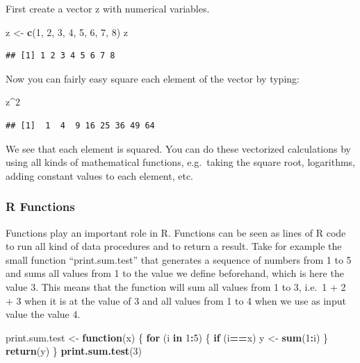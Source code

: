 \documentclass[]{book}
\newenvironment{Shaded}{\begin{snugshade}}{\end{snugshade}}
\newcommand{\KeywordTok}[1]{\textcolor[rgb]{0.13,0.29,0.53}{\textbf{#1}}}
\newcommand{\DecValTok}[1]{\textcolor[rgb]{0.00,0.00,0.81}{#1}}
\newcommand{\StringTok}[1]{\textcolor[rgb]{0.31,0.60,0.02}{#1}}
\newcommand{\ControlFlowTok}[1]{\textcolor[rgb]{0.13,0.29,0.53}{\textbf{#1}}}
\newcommand{\OperatorTok}[1]{\textcolor[rgb]{0.81,0.36,0.00}{\textbf{#1}}}
\newcommand{\NormalTok}[1]{#1}
\theoremstyle{definition}
\theoremstyle{definition}
\theoremstyle{definition}
\theoremstyle{remark}
\begin{document}
First create a vector z with numerical variables.

\begin{Shaded}
\begin{Highlighting}[]
\NormalTok{z <-}\StringTok{ }\KeywordTok{c}\NormalTok{(}\DecValTok{1}\NormalTok{, }\DecValTok{2}\NormalTok{, }\DecValTok{3}\NormalTok{, }\DecValTok{4}\NormalTok{, }\DecValTok{5}\NormalTok{, }\DecValTok{6}\NormalTok{, }\DecValTok{7}\NormalTok{, }\DecValTok{8}\NormalTok{)}
\NormalTok{z}
\end{Highlighting}
\end{Shaded}

\begin{verbatim}
## [1] 1 2 3 4 5 6 7 8
\end{verbatim}

Now you can fairly easy square each element of the vector by typing:

\begin{Shaded}
\begin{Highlighting}[]
\NormalTok{z}\OperatorTok{^}\DecValTok{2}
\end{Highlighting}
\end{Shaded}

\begin{verbatim}
## [1]  1  4  9 16 25 36 49 64
\end{verbatim}

We see that each element is squared. You can do these vectorized
calculations by using all kinds of mathematical functions, e.g.~taking
the square root, logarithms, adding constant values to each element,
etc.

\subsubsection{R Functions}\label{r-functions}

Functions play an important role in R. Functions can be seen as lines of
R code to run all kind of data procedures and to return a result. Take
for example the small function ``print.sum.test'' that generates a
sequence of numbers from 1 to 5 and sums all values from 1 to the value
we define beforehand, which is here the value 3. This means that the
function will sum all values from 1 to 3, i.e.~1 + 2 + 3 when it is at
the value of 3 and all values from 1 to 4 when we use as input value the
value 4.

\begin{Shaded}
\begin{Highlighting}[]
\NormalTok{print.sum.test <-}\StringTok{ }\ControlFlowTok{function}\NormalTok{(x) }
\NormalTok{\{}
 \ControlFlowTok{for}\NormalTok{ (i }\ControlFlowTok{in} \DecValTok{1}\OperatorTok{:}\DecValTok{5}\NormalTok{) }
\NormalTok{ \{}
   \ControlFlowTok{if}\NormalTok{ (i}\OperatorTok{==}\NormalTok{x) y <-}\StringTok{ }\KeywordTok{sum}\NormalTok{(}\DecValTok{1}\OperatorTok{:}\NormalTok{i)  }
\NormalTok{ \}}
\KeywordTok{return}\NormalTok{(y)}
\NormalTok{\}}
\KeywordTok{print.sum.test}\NormalTok{(}\DecValTok{3}\NormalTok{)}
\end{Highlighting}
\end{Shaded}
\end{document}
